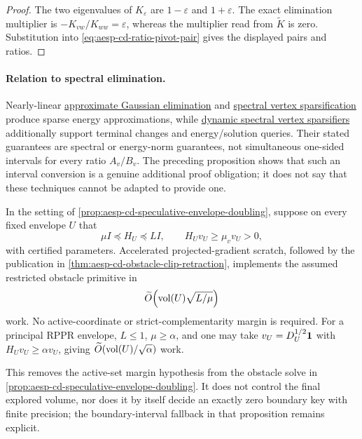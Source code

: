 \begin{proof}
The two eigenvalues of \(K_\varepsilon\) are
\(1-\varepsilon\) and \(1+\varepsilon\).  The exact elimination multiplier
is \(-K_{vw}/K_{ww}=\varepsilon\), whereas the multiplier read from
\(\widetilde K\) is zero.  Substitution into
\cref{eq:aesp-cd-ratio-pivot-pair} gives the displayed pairs and ratios.
\end{proof}

\paragraph{Relation to spectral elimination.}
Nearly-linear
\href{https://arxiv.org/abs/1605.02353}{approximate Gaussian elimination}
and
\href{https://arxiv.org/abs/1506.08204}{spectral vertex sparsification}
produce sparse energy approximations, while
\href{https://arxiv.org/abs/1906.10530}{dynamic spectral vertex
sparsifiers} additionally support terminal changes and energy/solution
queries.  Their stated guarantees are spectral or energy-norm guarantees,
not simultaneous one-sided intervals for every ratio \(A_v/B_v\).  The
preceding proposition shows that such an interval conversion is a genuine
additional proof obligation; it does not say that these techniques cannot be
adapted to provide one.

\begin{corollary}
\label{cor:aesp-cd-margin-free-obstacle-primitive}
In the setting of
\cref{prop:aesp-cd-speculative-envelope-doubling}, suppose on every fixed
envelope $U$ that
\begin{equation*}
 \mu I\preceq H_U\preceq LI,
 \qquad H_Uv_U\geq\mu_vv_U>0,
\end{equation*}
with certified parameters.  Accelerated projected-gradient scratch, followed
by the publication in
\cref{thm:aesp-cd-obstacle-clip-retraction}, implements the assumed
restricted obstacle primitive in
\begin{equation*}
 \widetilde O\!\left(\operatorname{vol}(U)\sqrt{L/\mu}\right)
\end{equation*}
work.  No active-coordinate or strict-complementarity margin is required.
For a principal RPPR envelope, $L\leq1$, $\mu\geq\alpha$, and one may take
$v_U=D_U^{1/2}\mathbf{1}$ with $H_Uv_U\geq\alpha v_U$, giving
$\widetilde O(\operatorname{vol}(U)/\sqrt\alpha)$ work.

This removes the active-set margin hypothesis from the obstacle solve in
\cref{prop:aesp-cd-speculative-envelope-doubling}.  It does not control the
final explored volume, nor does it by itself decide an exactly zero boundary
key with finite precision; the boundary-interval fallback in that proposition
remains explicit.
\end{corollary}

